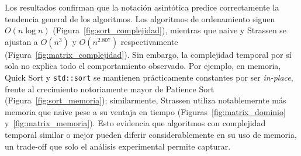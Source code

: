 Los resultados confirman que la notación asintótica predice correctamente la tendencia general de los algoritmos. Los algoritmos de ordenamiento siguen $O(n\log n)$ (Figura~\ref{fig:sort_complejidad}), mientras que naive y Strassen se ajustan a $O(n^3)$ y $O(n^{2.807})$ respectivamente (Figura~\ref{fig:matrix_complejidad}). Sin embargo, la complejidad temporal por sí sola no explica todo el comportamiento observado. Por ejemplo, en memoria, Quick Sort y
\texttt{std::sort} se mantienen prácticamente constantes por ser \textit{in-place}, frente al crecimiento notoriamente mayor de Patience Sort (Figura~\ref{fig:sort_memoria}); similarmente, Strassen utiliza notablemernte más memoria que naive pese a su ventaja en tiempo (Figuras~\ref{fig:matrix_dominio} y~\ref{fig:matrix_memoria}). Esto evidencia que algoritmos con complejidad temporal similar o mejor pueden diferir considerablemente en su uso de memoria, un trade-off que solo el análisis experimental permite capturar.
